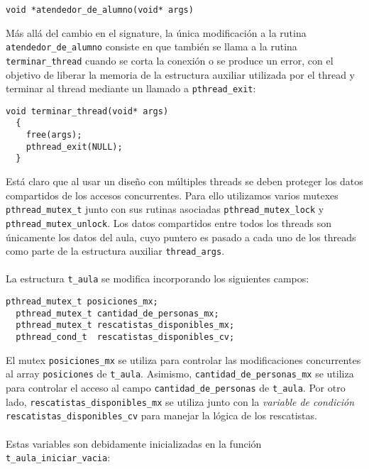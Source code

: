 \begin{lstlisting}[frame=leftline]
  void *atendedor_de_alumno(void* args)
\end{lstlisting}

Más allá del cambio en el signature, la única modificación a la rutina \texttt{atendedor\_de\_alumno} consiste en que también se llama a la rutina \texttt{terminar\_thread} cuando se corta la conexión o se produce un error, con el objetivo de liberar la memoria de la estructura auxiliar utilizada por el thread y terminar al thread mediante un llamado a \texttt{pthread\_exit}:

\begin{lstlisting}[frame=leftline]
  void terminar_thread(void* args)
  {
    free(args);
    pthread_exit(NULL);
  }
\end{lstlisting}

\newpage

Está claro que al usar un diseño con múltiples threads se deben proteger los datos compartidos de los accesos concurrentes. Para ello utilizamos varios mutexes \texttt{pthread\_mutex\_t} junto con sus rutinas asociadas \texttt{pthread\_mutex\_lock} y \texttt{pthread\_mutex\_unlock}. Los datos compartidos entre todos los threads son únicamente los datos del aula, cuyo puntero es pasado a cada uno de los threads como parte de la estructura auxiliar \texttt{thread\_args}.
\\\\
La estructura \texttt{t\_aula} se modifica incorporando los siguientes campos:

\begin{lstlisting}[frame=leftline]
  pthread_mutex_t posiciones_mx;
  pthread_mutex_t cantidad_de_personas_mx;
  pthread_mutex_t rescatistas_disponibles_mx;
  pthread_cond_t  rescatistas_disponibles_cv;
\end{lstlisting}

El mutex \texttt{posiciones\_mx} se utiliza para controlar las modificaciones concurrentes al array \texttt{posiciones} de \texttt{t\_aula}. Asimismo, \texttt{cantidad\_de\_personas\_mx} se utiliza para controlar el acceso al campo \texttt{cantidad\_de\_personas} de \texttt{t\_aula}. Por otro lado, \texttt{rescatistas\_disponibles\_mx} se utiliza junto con la \textit{variable de condición} \texttt{rescatistas\_disponibles\_cv} para manejar la lógica de los rescatistas.
\\\\
Estas variables son debidamente inicializadas en la función \texttt{t\_aula\_iniciar\_vacia}:

